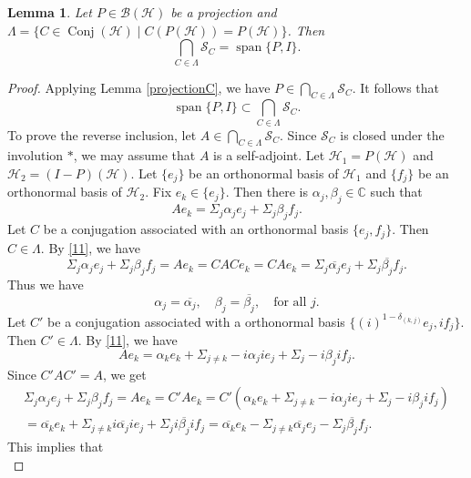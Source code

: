 \documentclass[11pt]{amsart}
\newtheorem{lemma}[theorem]{Lemma}
\theoremstyle{remark}
\newcommand{\BH}{\mathcal{B(H)}}
\newcommand{\cH}{{\mathcal{H}}}
\newcommand{\SC}{\mathcal{S}_C}
\newcommand{\Conj}{\operatorname{Conj}(\cH)}
\newcommand{\Span}{\operatorname{span}}
\begin{document}
\begin{lemma}\label{onep}
Let $P \in \BH$ be a projection and $\Lambda=\{ C \in \Conj \mid C(P(\cH))=P(\cH)\}$. Then 
\[
\bigcap_{C \in \Lambda} \SC=\Span \{P, I\}.
\]
\end{lemma}
\begin{proof}
Applying Lemma \ref{projectionC}, we have $P \in \bigcap_{C \in \Lambda} \SC$.  It follows that 
\[
\Span\{P,I\} \subset \bigcap_{C \in \Lambda} \SC.
\]
To prove the reverse inclusion,  let $A \in \bigcap_{C \in \Lambda} \SC$. Since $\SC$ is closed under the involution $*$, we may assume that $A$ is a self-adjoint. 
Let $\cH_1=P(\cH)$ and $\cH_2=(I-P)(\cH)$. Let $\{e_j\}$ be an orthonormal basis of $\cH_1$ and $\{f_j\}$ be an orthonormal basis of $\cH_2$.  Fix $e_k \in \{e_j\}$. 
 Then there is $\alpha_j, \beta_j \in \mathbb{C}$ such that 
\begin{equation}\label{11}
Ae_k=\Sigma_{j} \alpha_j e_j+\Sigma_{j} \beta_j f_j. 
\end{equation}
Let $C$ be a conjugation associated with an orthonormal basis $\{ e_j, f_j \}$. Then $C \in \Lambda$. By \eqref{11}, we have 
\[
\Sigma_{j} \alpha_j e_j+\Sigma_{j} \beta_j f_j=Ae_k=CACe_k=CAe_k=\Sigma_{j} \overline{\alpha_j} e_j+\Sigma_{j} \overline{\beta_j }f_j. 
\]
Thus we have
\begin{equation}\label{112}
\alpha_j=\overline{\alpha_j}, \quad  \beta_j=\overline{\beta_j }, \quad \text{for all } j.
\end{equation}
Let $C'$ be a conjugation associated with a orthonormal basis $\{ (i)^{1-\delta_{(k,j)}}e_j, i f_j \}$. Then $C' \in \Lambda$. By \eqref{11}, we have 
\begin{equation*}
Ae_k=\alpha_k  e_k+\Sigma_{j\neq k} -i \alpha_j i e_j+\Sigma_{j} -i \beta_j if_j. 
\end{equation*}
Since $C'AC'=A$, we get 
\begin{multline*}
\Sigma_{j} \alpha_j e_j+\Sigma_{j} \beta_j f_j=Ae_k=C'Ae_k=C'(\alpha_k  e_k+\Sigma_{j\neq k} -i \alpha_j i e_j+\Sigma_{j} -i \beta_j if_j)\\=\overline{\alpha_k}e_k+\Sigma_{j\neq k} i \overline{\alpha_j }  i e_j +\Sigma_{j} i \overline{\beta_j } if_j=\overline{\alpha_k}e_k-\Sigma_{j\neq k} \overline{\alpha_j} e_j-\Sigma_{j} \overline{\beta_j }f_j.
\end{multline*}
This implies that %
\begin{equation}\label{113}

\end{equation}
\end{proof}
\end{document}
